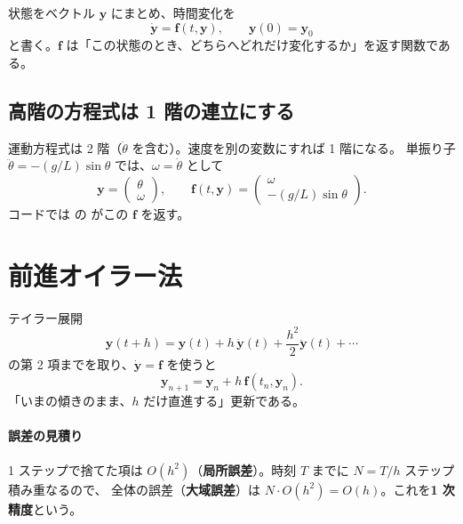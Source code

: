 状態をベクトル $\mathbf y$ にまとめ、時間変化を
\begin{equation}
  \dot{\mathbf y}=\mathbf f(t,\mathbf y),\qquad \mathbf y(0)=\mathbf y_0
  \label{eq:ivp}
\end{equation}
と書く。$\mathbf f$ は「この状態のとき、どちらへどれだけ変化するか」を返す関数である。

\subsection*{高階の方程式は 1 階の連立にする}

運動方程式は 2 階（$\ddot\theta$ を含む）。速度を別の変数にすれば 1 階になる。
単振り子 $\ddot\theta=-(g/L)\sin\theta$ では、$\omega=\dot\theta$ として
\begin{equation}
  \mathbf y=\begin{pmatrix}\theta\\ \omega\end{pmatrix},\qquad
  \mathbf f(t,\mathbf y)=\begin{pmatrix}\omega\\ -(g/L)\sin\theta\end{pmatrix}.
\end{equation}
コードでは  の  がこの $\mathbf f$ を返す。

\section{前進オイラー法}\label{sec:euler}

テイラー展開
\begin{equation}
  \mathbf y(t+h)=\mathbf y(t)+h\,\dot{\mathbf y}(t)+\frac{h^2}{2}\ddot{\mathbf y}(t)+\cdots
\end{equation}
の第 2 項までを取り、$\dot{\mathbf y}=\mathbf f$ を使うと
\begin{equation}
  \mathbf y_{n+1}=\mathbf y_n+h\,\mathbf f(t_n,\mathbf y_n).
  \label{eq:euler}
\end{equation}
「いまの傾きのまま、$h$ だけ直進する」更新である。

\paragraph{誤差の見積り}
1 ステップで捨てた項は $O(h^2)$（\textbf{局所誤差}）。時刻 $T$ までに $N=T/h$ ステップ積み重なるので、
全体の誤差（\textbf{大域誤差}）は $N\cdot O(h^2)=O(h)$。これを\textbf{1 次精度}という。

